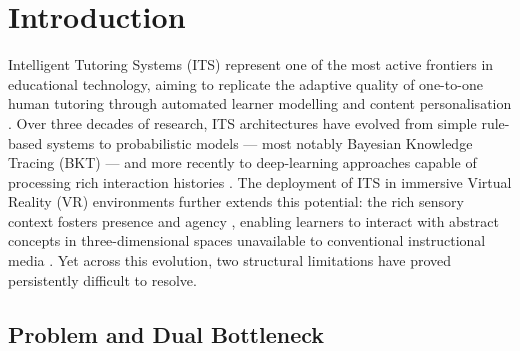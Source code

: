 \documentclass[ASNA,twocolumn]{USG} %
\begin{document}
\section{Introduction}
\label{sec:intro}

Intelligent Tutoring Systems (ITS) represent one of the most
active frontiers in educational technology, aiming to replicate
the adaptive quality of one-to-one human tutoring through
automated learner modelling and content personalisation
\cite{Corbett1995}.
Over three decades of research, ITS architectures have evolved
from simple rule-based systems to probabilistic models ---
most notably Bayesian Knowledge Tracing (BKT)
\cite{Corbett1995} --- and more recently to deep-learning
approaches capable of processing rich interaction histories
\cite{Piech2015,Ghosh2020}.
The deployment of ITS in immersive Virtual Reality (VR)
environments further extends this potential: the rich sensory
context fosters presence and agency \cite{Makransky2021},
enabling learners to interact with abstract concepts in
three-dimensional spaces unavailable to conventional
instructional media \cite{Marougkas2024}.
Yet across this evolution, two structural limitations have
proved persistently difficult to resolve.

\subsection{Problem and Dual Bottleneck}
\label{sec:intro_problem}
\end{document}
